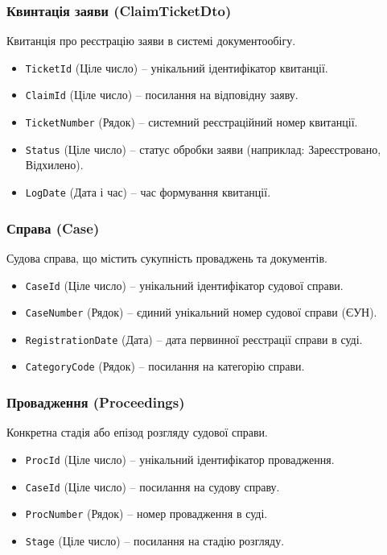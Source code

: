 \documentclass{article}
\begin{document}
\subsubsection{Квинтація заяви (ClaimTicketDto)}
Квитанція про реєстрацію заяви в системі документообігу.
\begin{itemize}
    \item \texttt{TicketId} (Ціле число) -- унікальний ідентифікатор квитанції.
    \item \texttt{ClaimId} (Ціле число) -- посилання на відповідну заяву.
    \item \texttt{TicketNumber} (Рядок) -- системний реєстраційний номер квитанції.
    \item \texttt{Status} (Ціле число) -- статус обробки заяви (наприклад: Зареєстровано, Відхилено).
    \item \texttt{LogDate} (Дата і час) -- час формування квитанції.
\end{itemize}

\subsubsection{Справа (Case)}
Судова справа, що містить сукупність проваджень та документів.
\begin{itemize}
    \item \texttt{CaseId} (Ціле число) -- унікальний ідентифікатор судової справи.
    \item \texttt{CaseNumber} (Рядок) -- єдиний унікальний номер судової справи (ЄУН).
    \item \texttt{RegistrationDate} (Дата) -- дата первинної реєстрації справи в суді.
    \item \texttt{CategoryCode} (Рядок) -- посилання на категорію справи.
\end{itemize}

\subsubsection{Провадження (Proceedings)}
Конкретна стадія або епізод розгляду судової справи.
\begin{itemize}
    \item \texttt{ProcId} (Ціле число) -- унікальний ідентифікатор провадження.
    \item \texttt{CaseId} (Ціле число) -- посилання на судову справу.
    \item \texttt{ProcNumber} (Рядок) -- номер провадження в суді.
    \item \texttt{Stage} (Ціле число) -- посилання на стадію розгляду.
\end{itemize}
\end{document}
